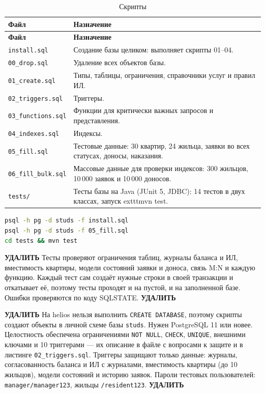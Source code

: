 \documentclass[12pt,a4paper]{article}
\begin{document}
\begin{longtable}{L{38.3mm} L{122.9mm}}
\caption{Скрипты}\label{tab:scripts}\\
\toprule \textbf{Файл} & \textbf{Назначение} \\ \midrule
\endfirsthead
\toprule \textbf{Файл} & \textbf{Назначение} \\ \midrule
\endhead
\bottomrule
\endfoot
\texttt{install.\allowbreak{}sql} & Создание базы целиком: выполняет скрипты 01--04. \\
\texttt{00\_\allowbreak{}drop.sql} & Удаление всех объектов базы. \\
\texttt{01\_\allowbreak{}create.sql} & Типы, таблицы, ограничения, справочники услуг и правил ИЛ. \\
\texttt{02\_\allowbreak{}triggers.sql} & Триггеры. \\
\texttt{03\_\allowbreak{}functions.sql} & Функции для критически важных запросов и представления. \\
\texttt{04\_\allowbreak{}indexes.sql} & Индексы. \\
\texttt{05\_\allowbreak{}fill.sql} & Тестовые данные: 30 квартир, 24 жильца, заявки во всех статусах, доносы, наказания. \\
\texttt{06\_\allowbreak{}fill\_\allowbreak{}bulk.sql} & Массовые данные для проверки индексов: 300 жильцов, 10\,000 заявок и 10\,000 доносов. \\
\texttt{tests/} & Тесты базы на Java (JUnit 5, JDBC): 14 тестов в двух классах, запуск 	exttt{mvn test}. \\
\end{longtable}
\begin{lstlisting}[language=bash]
psql -h pg -d studs -f install.sql
psql -h pg -d studs -f 05_fill.sql
cd tests && mvn test
\end{lstlisting}

\textbf{УДАЛИТЬ} Тесты проверяют ограничения таблиц, журналы баланса и ИЛ, вместимость квартиры, модели состояний заявки и доноса, связь M:N и каждую функцию. Каждый тест сам создаёт нужные строки в своей транзакции и откатывает её, поэтому тесты проходят и на пустой, и на заполненной базе. Ошибки проверяются по коду SQLSTATE. \textbf{УДАЛИТЬ}

\textbf{УДАЛИТЬ} На helios нельзя выполнить \texttt{CREATE DATABASE}, поэтому скрипты создают объекты в личной схеме базы \texttt{studs}. Нужен PostgreSQL 11 или новее. Целостность обеспечена ограничениями \texttt{NOT NULL}, \texttt{CHECK}, \texttt{UNIQUE}, внешними ключами и 10 триггерами --- их описание в файле с вопросами к защите и в листинге \texttt{02\_\allowbreak{}triggers.sql}. Триггеры защищают только данные: журналы, согласованность баланса и ИЛ с журналами, вместимость квартиры (до 10 жильцов), модели состояний и историю заявок. Пароли тестовых пользователей: \texttt{manager/manager123}, жильцы \texttt{/resident123}. \textbf{УДАЛИТЬ}
\end{document}
